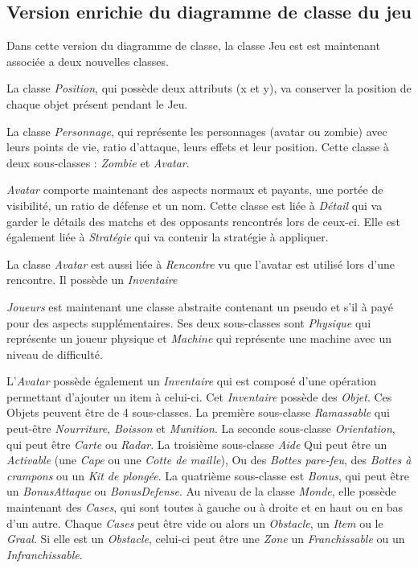 
\subsection{Version enrichie du diagramme de classe du jeu}
\label{sec:question-2}

Dans cette version du diagramme de classe, la classe Jeu est est maintenant associée a deux nouvelles classes.

La classe \emph{Position}, qui possède deux attributs (x et y), va conserver la position de chaque objet présent pendant le Jeu.

La classe \emph{Personnage}, qui représente les personnages (avatar ou zombie) avec leurs points de vie, ratio d'attaque, leurs effets et leur position. Cette classe à deux sous-classes :
\emph{Zombie} et \emph{Avatar}.

\emph{Avatar} comporte maintenant des aspects normaux et payants, une portée de visibilité, un ratio de défense et un nom. Cette classe est liée à \emph{Détail} qui va garder le détails des matchs et des
opposants rencontrés lors de ceux-ci. Elle est également liée à \emph{Stratégie} qui va contenir la stratégie à appliquer.

La classe \emph{Avatar} est aussi liée à \emph{Rencontre} vu que l'avatar est utilisé lors d'une rencontre. Il possède un \emph{Inventaire}

\emph{Joueurs} est maintenant une classe abstraite contenant un pseudo et s'il à payé pour des aspects supplémentaires. Ses deux sous-classes sont \emph{Physique} qui représente un joueur physique et 
\emph{Machine} qui représente une machine avec un niveau de difficulté.

L'\emph{Avatar} possède également un \emph{Inventaire} qui est composé d'une opération permettant d'ajouter un item à celui-ci. Cet \emph{Inventaire} possède des \emph{Objet}. Ces Objets peuvent être de 4
sous-classes. La première sous-classe \emph{Ramassable} qui peut-être \emph{Nourriture}, \emph{Boisson} et \emph{Munition}. La seconde sous-classe \emph{Orientation}, qui peut être \emph{Carte} ou \emph{Radar}.
La troisième sous-classe \emph{Aide} Qui peut être un \emph{Activable} (une \emph{Cape} ou une \emph{Cotte de maille}), Ou des \emph{Bottes pare-feu}, des \emph{Bottes à crampons} ou un \emph{Kit de plongée}. La quatrième
sous-classe est \emph{Bonus}, qui peut être un \emph{BonusAttaque} ou \emph{BonusDefense}.
Au niveau de la classe \emph{Monde}, elle possède maintenant des \emph{Cases}, qui sont toutes à gauche ou à droite et en haut ou en bas d'un autre. Chaque \emph{Cases} peut être vide ou
alors un \emph{Obstacle}, un \emph{Item} ou le \emph{Graal}. Si elle est un \emph{Obstacle}, celui-ci peut être une \emph{Zone} un \emph{Franchissable} ou un \emph{Infranchissable}.


